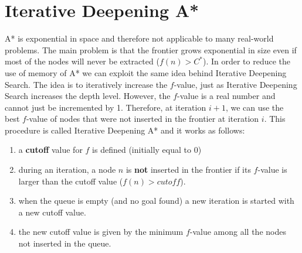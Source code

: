 \section{Iterative Deepening A*}
A* is exponential in space and therefore not applicable to many real-world problems. The main problem is that the frontier grows exponential in size even if
most of the nodes will never be extracted ($f(n) > C^*$). In order to reduce the use of memory of A* we can exploit the same idea behind Iterative Deepening Search. \newline\newline
The idea is to iteratively increase the $f$-value, just as Iterative Deepening Search increases the depth level. However, the $f$-value is a real number and cannot just be incremented by 1. Therefore, at iteration $i+1$, we can  use the best $f$-value of nodes that were not inserted in the frontier at iteration $i$.
\newline\newline
This procedure is called Iterative Deepening A* and it works as follows:
\begin{enumerate}
    \item a \textbf{cutoff} value for $f$ is defined (initially equal to 0)

    \item during an iteration, a node $n$ is \textbf{not} inserted in the frontier if its $f$-value is larger than the cutoff value ($f(n) > cutoff$).

    \item when the queue is empty (and no goal found) a new iteration is started with a new cutoff value.

    \item the new cutoff value is given by the minimum $f$-value among all the nodes not inserted in the queue.
\end{enumerate}

